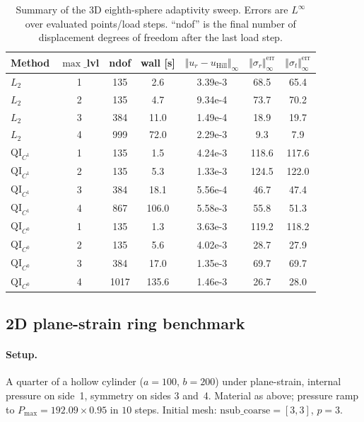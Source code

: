 \documentclass[11pt,a4paper]{article}
\begin{document}
\begin{table}[h]
\centering
\small
\begin{tabular}{l c c c c c c}
\toprule
Method & $\max\_$lvl & ndof & wall [s] & $\Vert u_r - u_{\mathrm{Hill}}\Vert_\infty$ & $\Vert\sigma_r\Vert_\infty^{\mathrm{err}}$ & $\Vert\sigma_t\Vert_\infty^{\mathrm{err}}$ \\
\midrule
$L_2$              & 1 & 135 & 2.6   & 3.39e-3 & 68.5 & 65.4 \\
$L_2$              & 2 & 135 & 4.7   & 9.34e-4 & 73.7 & 70.2 \\
$L_2$              & 3 & 384 & 11.0  & 1.49e-4 & 18.9 & 19.7 \\
$L_2$              & 4 & 999 & 72.0  & 2.29e-3 & 9.3  & 7.9  \\
\midrule
$\mathrm{QI}_{C^1}$ & 1 & 135 & 1.5   & 4.24e-3 & 118.6 & 117.6 \\
$\mathrm{QI}_{C^1}$ & 2 & 135 & 5.3   & 1.33e-3 & 124.5 & 122.0 \\
$\mathrm{QI}_{C^1}$ & 3 & 384 & 18.1  & 5.56e-4 & 46.7  & 47.4  \\
$\mathrm{QI}_{C^1}$ & 4 & 867 & 106.0 & 5.58e-3 & 55.8  & 51.3  \\
\midrule
$\mathrm{QI}_{C^0}$ & 1 & 135 & 1.3   & 3.63e-3 & 119.2 & 118.2 \\
$\mathrm{QI}_{C^0}$ & 2 & 135 & 5.6   & 4.02e-3 & 28.7  & 27.9  \\
$\mathrm{QI}_{C^0}$ & 3 & 384 & 17.0  & 1.35e-3 & 69.7  & 69.7  \\
$\mathrm{QI}_{C^0}$ & 4 & 1017& 135.6 & 1.46e-3 & 26.7  & 28.0  \\
\bottomrule
\end{tabular}
\caption{Summary of the 3D eighth-sphere adaptivity sweep.  Errors are
$L^\infty$ over evaluated points/load steps.  ``ndof'' is the final
number of displacement degrees of freedom after the last load step.}
\end{table}

\subsection{2D plane-strain ring benchmark}\label{sec:exp2D}

\paragraph{Setup.}
A quarter of a hollow cylinder ($a = 100$, $b = 200$) under plane-strain,
internal pressure on side~1, symmetry on sides 3 and~4.  Material as
above; pressure ramp to $P_{\max} = 192.09 \times 0.95$ in $10$ steps.
Initial mesh: $\mathrm{nsub\_coarse} = [3,3]$, $p = 3$.
\end{document}
